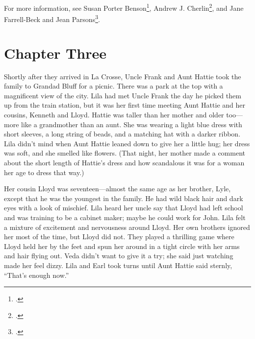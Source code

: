 \documentclass[
  letterpaper,
]{book}
\begin{document}
For more information, see Susan Porter Benson\footnote{.}, Andrew J.
Cherlin\footnote{.}, and Jane Farrell-Beck and Jean
Parsons\footnote{.}.


\chapter{Chapter Three}\label{chapter-three}

Shortly after they arrived in La Crosse, Uncle Frank and Aunt Hattie
took the family to Grandad Bluff for a picnic. There was a park at the
top with a magnificent view of the city. Lila had met Uncle Frank the
day he picked them up from the train station, but it was her first time
meeting Aunt Hattie and her cousins, Kenneth and Lloyd. Hattie was
taller than her mother and older too---more like a grandmother than an
aunt. She was wearing a light blue dress with short sleeves, a long
string of beads, and a matching hat with a darker ribbon. Lila didn't
mind when Aunt Hattie leaned down to give her a little hug; her dress
was soft, and she smelled like flowers. (That night, her mother made a
comment about the short length of Hattie's dress and how scandalous it
was for a woman her age to dress that way.)

Her cousin Lloyd was seventeen---almost the same age as her brother,
Lyle, except that he was the youngest in the family. He had wild black
hair and dark eyes with a look of mischief. Lila heard her uncle say
that Lloyd had left school and was training to be a cabinet maker; maybe
he could work for John. Lila felt a mixture of excitement and
nervousness around Lloyd. Her own brothers ignored her most of the time,
but Lloyd did not. They played a thrilling game where Lloyd held her by
the feet and spun her around in a tight circle with her arms and hair
flying out. Veda didn't want to give it a try; she said just watching
made her feel dizzy. Lila and Earl took turns until Aunt Hattie said
sternly, ``That's enough now.''
\end{document}
